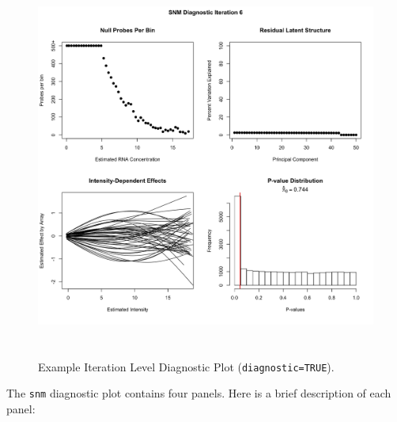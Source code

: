 \documentclass[11pt]{article}
\newcommand{\Rfunction}[1]{{\texttt{#1}}}
\begin{document}
\begin{figure}[pt]
  \begin{center}
    \includegraphics[width=5in,height=5in]{egDiagPlot.png}
  \end{center}
  \caption{Example Iteration Level Diagnostic Plot ({\tt diagnostic=TRUE}).}\label{fig:diagPlot1}
\end{figure}

The \Rfunction{snm} diagnostic plot contains four panels.  Here is a brief description of each panel:
\end{document}
